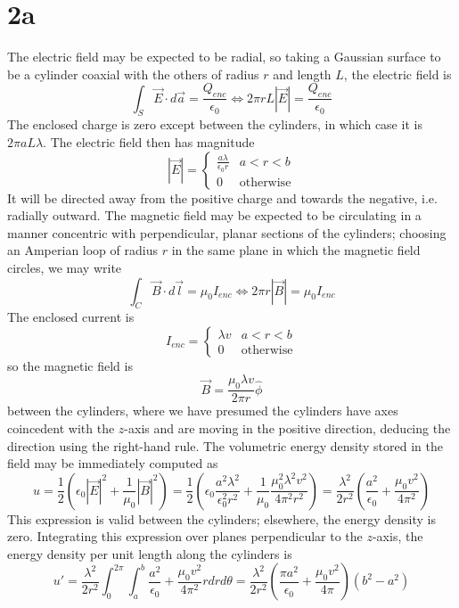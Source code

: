 \documentclass{article}
\begin{document}
\section*{2a}
The electric field may be expected to be radial, so taking a Gaussian surface to be a cylinder coaxial with the others of radius $r$ and length $L$, the electric field is
\[\int_{S}\vec{E}\cdot d\vec{a}=\frac{Q_{enc}}{\epsilon_{0}}\Leftrightarrow 2\pi rL|\vec{E}|=\frac{Q_{enc}}{\epsilon_{0}}\]
The enclosed charge is zero except between the cylinders, in which case it is $2\pi a L \lambda$. The electric field then has magnitude
\[ |\vec{E}|=
  \begin{cases}
    \frac{a\lambda}{\epsilon_{0} r} & a < r < b \\
    0 & \textrm{otherwise}
  \end{cases}
\]
It will be directed away from the positive charge and towards the negative, i.e. radially outward.
The magnetic field may be expected to be circulating in a manner concentric with perpendicular, planar sections of the cylinders; choosing an Amperian loop of radius $r$ in the same plane in which the magnetic field circles, we may write
\[\int_{C}\vec{B}\cdot d\vec{l}=\mu_{0}I_{enc}\Leftrightarrow 2\pi r|\vec{B}|=\mu_{0}I_{enc}\]
The enclosed current is
\[I_{enc}=
  \begin{cases}
    \lambda v & a < r < b \\
    0 & \textrm{otherwise}
  \end{cases}
\]
so the magnetic field is
\[\vec{B}=\frac{\mu_{0}\lambda v}{2\pi r}\hat{\phi}\]
between the cylinders, where we have presumed the cylinders have axes coincedent with the $z$-axis and are moving in the positive direction, deducing the direction using the right-hand rule.
The volumetric energy density stored in the field may be immediately computed as
\[u=\frac{1}{2}\left( \epsilon_{0}|\vec{E}|^{2}+\frac{1}{\mu_{0}}|\vec{B}|^{2} \right)=\frac{1}{2}\left( \epsilon_{0}\frac{a^{2}\lambda^{2}}{\epsilon_{0}^{2}r^{2}} +\frac{1}{\mu_{0}}\frac{\mu_{0}^{2}\lambda^{2}v^{2}}{4\pi^{2}r^{2}}\right)=\frac{\lambda^{2}}{2r^{2}}\left( \frac{a^{2}}{\epsilon_{0}}+\frac{\mu_{0}v^{2}}{4\pi^{2}} \right)\]
This expression is valid between the cylinders; elsewhere, the energy density is zero. Integrating this expression over planes perpendicular to the $z$-axis, the energy density per unit length along the cylinders is
\[u'=\frac{\lambda^{2}}{2r^{2}}\int_{0}^{2\pi}\int_{a}^{b}\frac{a^{2}}{\epsilon_{0}}+\frac{\mu_{0}v^{2}}{4\pi^{2}}rdrd\theta=\frac{\lambda^{2}}{2r^{2}}\left( \frac{\pi a^{2}}{\epsilon_{0}}+\frac{\mu_{0 }v^{2}}{4\pi} \right)(b^{2}-a^{2})\]
\end{document}
